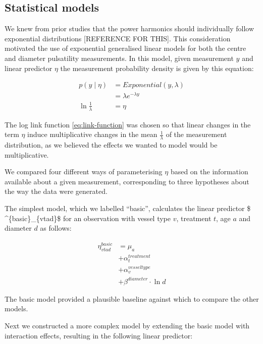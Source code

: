 \documentclass[
  letterpaper,
  DIV=11,
  numbers=noendperiod,
  oneside]{scrartcl}
\theoremstyle{plain}
\theoremstyle{remark}
\begin{document}
\subsection{Statistical models}\label{statistical-models-1}

We knew from prior studies that the power harmonics should individually
follow exponential distributions {[}REFERENCE FOR THIS{]}. This
consideration motivated the use of exponential generalised linear models
for both the centre and diameter pulsatility measurements. In this
model, given measurement \(y\) and linear predictor \(\eta\) the
measurement probability density is given by this equation:

\begin{align}
  p(y\mid\eta) &= Exponential(y, \lambda) \label{eq:pulsatility-measurement-model}  \\
  &= \lambda e^{-\lambda y}  \nonumber \\
  \ln{\frac{1}{\lambda}} &= \eta \label{eq:link-function}
\end{align}

The log link function \eqref{eq:link-function} was chosen so that linear
changes in the term \(\eta\) induce multiplicative changes in the mean
\(\frac{1}
{\lambda}\) of the measurement distribution, as we believed the effects
we wanted to model would be multiplicative.

We compared four different ways of parameterising \(\eta\) based on the
information available about a given measurement, corresponding to three
hypotheses about the way the data were generated.

The simplest model, which we labelled ``basic'', calculates the linear
predictor \$ \eta\^{}\{basic\}\_\{vtad\}\$ for an observation with
vessel type \(v\), treatment \(t\), age \(a\) and diameter \(d\) as
follows:

\begin{align}
        \label{eq:basic}
    \eta^{basic}_{vtad} &= \mu_{a} \\
      &+ \alpha^{treatment}_{t} \nonumber \\
      &+ \alpha^{vesseltype}_{v} \nonumber \\
      &+ \beta^{diameter} \cdot \ln{d} \nonumber
\end{align}

The basic model provided a plausible baseline against which to compare
the other models.

Next we constructed a more complex model by extending the basic model
with interaction effects, resulting in the following linear predictor:
\end{document}
